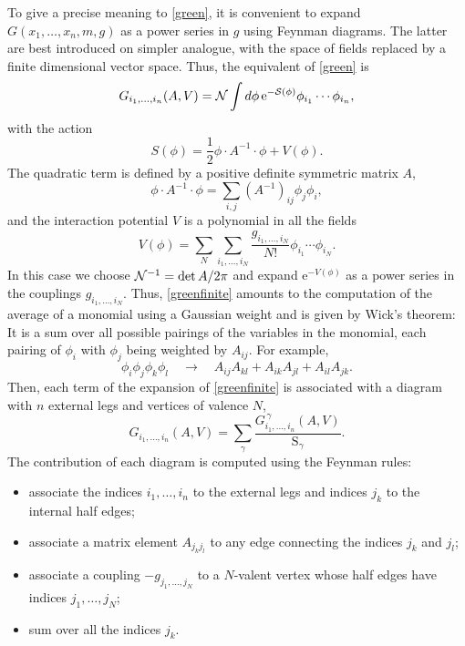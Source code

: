 \documentclass[12pt,here,feynmf]{article}
\begin{document}
To give a precise meaning to \eqref{green}, it is convenient to expand  $G(x_{1},\dots,x_{n},m,g)$ as a power series in $g$ using Feynman diagrams. The latter are best introduced on simpler analogue, with the space of fields replaced by a finite dimensional vector space. Thus, the equivalent of \eqref{green} is
\begin{equation}
G_{i_{1},\dots,i_{n}}(A,V)={\cal N}\int d\phi\,\mathrm{e}^{-\cal{S}(\phi)}\phi_{i_{1}}\cdots\phi_{i_{n}},
\label{greenfinite}
\end{equation}
with the action
\begin{equation}
S(\phi)=\frac{1}{2}\phi\cdot A^{-1}\cdot\phi +V(\phi).
\end{equation}
The quadratic term is defined by a positive definite symmetric matrix $A$,
\begin{equation}
\phi\cdot A^{-1}\!\cdot\phi=\sum_{i,j}(A^{-1})_{ij}\phi_{j}\phi_{i},
\end{equation}
and the interaction potential $V$ is a polynomial in all the fields
\begin{equation}
V(\phi)=\sum_{N}\sum_{i_{1},\dots,i_{N}}\frac{g_{i_{1},\dots,i_{N}}}{N!}\phi_{i_{1}}\cdots\phi_{i_{N}}.
\label{finitepot}
\end{equation}
In this case we choose ${\cal N}^{-1}=\det A/2\pi$ and expand $\mathrm{e}^{-V(\phi)}$ as a power series in the couplings $g_{i_{1},\dots,i_{N}}$. Thus, \eqref{greenfinite} amounts to the computation of the average of a monomial using a Gaussian weight and is given by Wick's theorem: It is a sum over all possible pairings of the variables in the monomial, each pairing of $\phi_{i}$ with $\phi_{j}$ being weighted by $A_{ij}$. For example,
 \begin{equation}
 \phi_{i} \phi_{j} \phi_{k} \phi_{l}\quad\rightarrow\quad
A_{ij}A_{kl}+A_{ik}A_{jl}+A_{il}A_{jk}.
\end{equation}
Then, each term of the expansion of \eqref{greenfinite} is associated with a diagram with $n$ external legs and vertices of valence $N$,
\begin{equation}
G_{i_{1},\dots,i_{n}}(A,V)=\sum_{\gamma}\frac{G^{\,\gamma}_{i_{1},\dots,i_{n}}(A,V)}{\mathrm{S}_{\gamma}}\label{finitediag}.
\end{equation}
The contribution of each diagram is computed using the Feynman rules:
\begin{itemize}
\item
associate the indices $i_{1},\dots,i_{n}$ to the external legs and indices $j_{k}$ to the internal half edges;
\item
associate a matrix element $A_{j_{k}j_{l}}$ to any edge connecting the indices $j_k$ and $j_l$;
\item
associate a coupling $-g_{j_{1},\dots,j_{N}}$ to a $N$-valent vertex  whose half edges have indices $j_{1},\dots,j_{N}$;
\item
sum over all the indices $j_{k}$.
\end{itemize}
\end{document}
